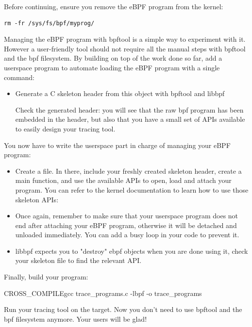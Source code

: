 Before continuing, ensure you remove the eBPF program from the kernel:

\begin{verbatim}
rm -fr /sys/fs/bpf/myprog/
\end{verbatim}

Managing the eBPF program with bpftool is a simple way to experiment with
it. However a user-friendly tool should not require all the manual steps
with bpftool and the bpf filesystem. By building on top of the work done so
far, add a userspace program to automate loading the eBPF program with a
single command:

\begin{itemize}
  \item Generate a C skeleton header from this object with bpftool and libbpf
  Check the generated header: you will see that the raw bpf program has been
  embedded in the header, but also that you have a small set of APIs available
  to easily design your tracing tool.
\end{itemize}

You now have to write the userspace part in charge of managing your eBPF program:
\begin{itemize}
  \item Create a  file. In there, include your freshly created skeleton header, create a main function, and use the available APIs to open, load and attach your program. You can refer to the kernel documentation to learn how to use those skeleton APIs: 
  \item Once again, remember to make sure that your userspace program does not end after attaching your eBPF program, otherwise it will be detached and unloaded immediately. You can add a busy loop in your code to prevent it.
  \item libbpf expects you to "destroy" ebpf objects when you are done using it, check your skeleton file to find the relevant API.
\end{itemize}

Finally, build your program:
\begin{bashinput}
$ ${CROSS_COMPILE}gcc trace_programs.c -lbpf -o trace_programs
\end{bashinput}

Run your tracing tool on the target. Now you don't need to use bpftool and
the bpf filesystem anymore. Your users will be glad!

